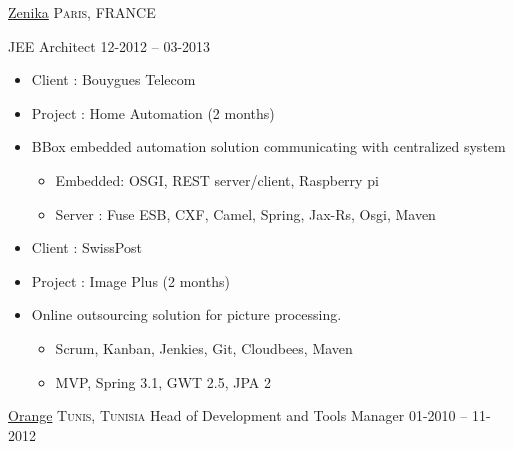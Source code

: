 \documentclass[10pt,a4paper]{article}
\begin{document}
\headedsection  %
  {\href{http://www.zenika.com/}{Zenika} }
  {\textsc{Paris, FRANCE}} {%
  \headedsubsection
    {JEE Architect}
    {12-2012 -- 03-2013}
    {
\begin{itemize} \itemsep -2pt  %
\item Client : Bouygues Telecom
\item Project : Home Automation (2 months)
\item BBox embedded automation solution communicating with centralized system
\begin{itemize} \itemsep -2pt  %
\item Embedded: OSGI, REST server/client, Raspberry pi
\item Server : Fuse ESB, CXF, Camel, Spring, Jax-Rs, Osgi, Maven
\end{itemize}

\item Client : SwissPost
\item Project : Image Plus (2 months)
\item Online outsourcing solution for picture processing.

\begin{itemize} \itemsep -2pt  %
\item Scrum, Kanban, Jenkies, Git, Cloudbees, Maven
\item MVP, Spring 3.1, GWT 2.5, JPA 2
\end{itemize}

\end{itemize}}
}

\headedsection  %
  {\href{http://www.orange.tn/}{Orange} }
  {\textsc{Tunis, Tunisia}} {%
  \headedsubsection
    { Head of Development and Tools Manager}
    {01-2010 -- 11-2012}
    {}
}
\end{document}
